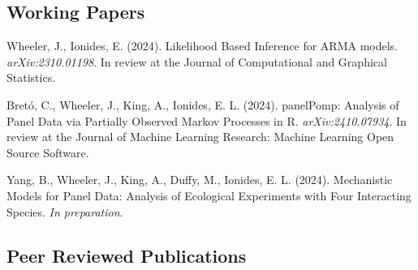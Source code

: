 \documentclass[11pt]{article}
\newenvironment {reflist}
                {
                 \begin{list}{}
                 {\setlength{\labelwidth}{0mm}
                  \setlength{\leftmargin}{8mm}
                  \setlength{\itemindent}{-3mm}
                  \setlength{\labelsep}{0mm}
                  \setlength{\parsep}{0.1 ex}
                  \setlength{\itemsep}{0.1cm}
      \setlength{\topsep}{0.15cm}}} %
   {\end{list}}
\begin{document}
\subsection*{Working Papers}

\begin{reflist}

    \item Wheeler, J., Ionides, E. (2024). Likelihood Based Inference for ARMA models. {\it arXiv:2310.01198}. In review at the Journal of Computational and Graphical Statistics.

    \item Bret\'o, C., Wheeler, J., King, A., Ionides, E. L. (2024). panelPomp: Analysis of Panel Data via Partially Observed Markov Processes in R. {\it arXiv:2410.07934}. In review at the Journal of Machine Learning Research: Machine Learning Open Source Software.

    \item Yang, B., Wheeler, J., King, A., Duffy, M., Ionides, E. L. (2024). Mechanistic Models for Panel Data: Analysis of Ecological Experiments with Four Interacting Species. {\it In preparation}.

\end{reflist}

\subsection*{Peer Reviewed Publications}
\end{document}
